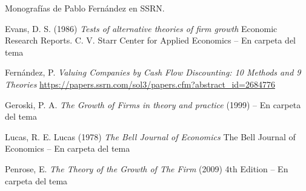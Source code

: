 \documentclass{nuevotema}
\begin{document}
Monografías de Pablo Fernández en SSRN.

Evans, D. S. (1986) \textit{Tests of alternative theories of firm growth} Economic Research Reports. C. V. Starr Center for Applied Economics -- En carpeta del tema

Fernández, P. \textit{Valuing Companies by Cash Flow Discounting: 10 Methods and 9 Theories } \url{https://papers.ssrn.com/sol3/papers.cfm?abstract\_id=2684776}

Geroski, P. A. \textit{The Growth of Firms in theory and practice} (1999) -- En carpeta del tema

Lucas, R. E. Lucas (1978) \textit{The Bell Journal of Economics} The Bell Journal of Economics -- En carpeta del tema

Penrose, E. \textit{The Theory of the Growth of The Firm} (2009) 4th Edition -- En carpeta del tema
\end{document}
